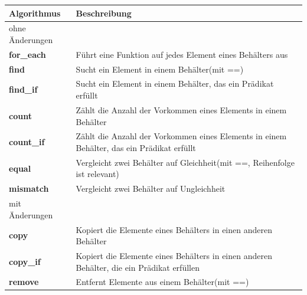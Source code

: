 \documentclass[12pt]{scrartcl}
\begin{document}
\begin{table}[H]
	\centering
	\begin{tabular}{ p{4cm} | p{11cm} }
		Algorithmus           & Beschreibung                                                                                                               \\
		\hline
		ohne Änderungen       &                                                                                                                            \\
		\hline
		\textbf{for\_each}    & Führt eine Funktion auf jedes Element eines Behälters aus                                                                  \\
		\textbf{find}         & Sucht ein Element in einem Behälter(mit ==)                                                                                \\
		\textbf{find\_if}     & Sucht ein Element in einem Behälter, das ein Prädikat erfüllt                                                              \\
		\textbf{count}        & Zählt die Anzahl der Vorkommen eines Elements in einem Behälter                                                            \\
		\textbf{count\_if}    & Zählt die Anzahl der Vorkommen eines Elements in einem Behälter, das ein Prädikat erfüllt                                  \\
		\textbf{equal}        & Vergleicht zwei Behälter auf Gleichheit(mit ==, Reihenfolge ist relevant)                                                  \\
		\textbf{mismatch}     & Vergleicht zwei Behälter auf Ungleichheit                                                                                  \\
		\hline
		mit Änderungen        &                                                                                                                            \\
		\hline
		\textbf{copy}         & Kopiert die Elemente eines Behälters in einen anderen Behälter                                                             \\
		\textbf{copy\_if}     & Kopiert die Elemente eines Behälters in einen anderen Behälter, die ein Prädikat erfüllen                                  \\
		\textbf{remove}       & Entfernt Elemente aus einem Behälter(mit ==)                                                                               \\

\end{tabular}
\end{table}
\end{document}
